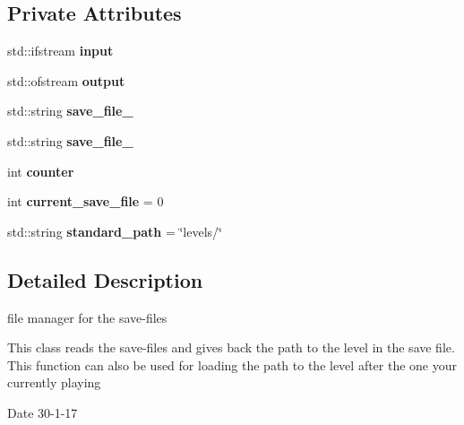 \subsection*{Private Attributes}
\begin{DoxyCompactItemize}
\item 
\mbox{\label{classfile__management_aa5b855928609e6725e9912d4d5113455}} 
std\+::ifstream {\bfseries input}
\item 
\mbox{\label{classfile__management_af8152191fda966b0f308a33f530278da}} 
std\+::ofstream {\bfseries output}
\item 
\mbox{\label{classfile__management_a503b8f617941c7bcce5fd6d1898fceae}} 
std\+::string {\bfseries save\+\_\+file\+\_}
\item 
\mbox{\label{classfile__management_aa5040a08dff914b113025893ef56ad45}} 
std\+::string {\bfseries save\+\_\+file\+\_}
\item 
\mbox{\label{classfile__management_a93097112df7cf7b9783004c8c8ce19eb}} 
int {\bfseries counter}
\item 
\mbox{\label{classfile__management_a3089e02713d9608fa342ea5673a88845}} 
int {\bfseries current\+\_\+save\+\_\+file} = 0
\item 
\mbox{\label{classfile__management_ab08321ef015c6e8843b4632b3ae9c463}} 
std\+::string {\bfseries standard\+\_\+path} = \char`\"{}levels/\char`\"{}
\end{DoxyCompactItemize}


\subsection{Detailed Description}
file manager for the save-\/files 

This class reads the save-\/files and gives back the path to the level in the save file. This function can also be used for loading the path to the level after the one your currently playing

\begin{DoxyDate}{Date}
30-\/1-\/17 
\end{DoxyDate}


